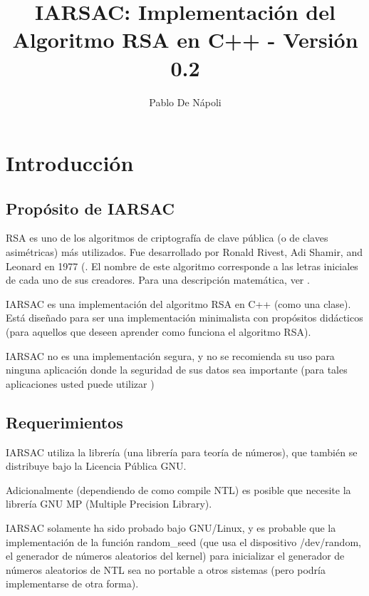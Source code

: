 \documentclass[spanish]{article}
\begin{document}
\title{IARSAC: Implementación del Algoritmo RSA en C++ - Versión 0.2}


\author{Pablo De Nápoli}

\maketitle

\section{Introducción}

\subsection*{Propósito de IARSAC}

RSA es uno de los algoritmos de criptografía de clave pública (o de
claves asimétricas) más utilizados. Fue desarrollado por Ronald Rivest,
Adi Shamir, and Leonard en 1977 (\cite{Rsa78}. El nombre de este
algoritmo corresponde a las letras iniciales de cada uno de sus 
creadores. Para una descripción matemática, ver \cite{K}.

IARSAC es una implementación del algoritmo RSA en C++ (como una clase).
Está diseñado para ser una implementación minimalista con propósitos
didácticos (para aquellos que deseen aprender como funciona el algoritmo
RSA).

IARSAC no es una implementación segura, y no se recomienda su uso
para ninguna aplicación donde la seguridad de sus datos sea importante
(para tales aplicaciones usted puede utilizar 
)

\subsection*{Requerimientos}

IARSAC utiliza la librería  
(una librería para teoría de números), que también se distribuye bajo 
la Licencia Pública GNU.

Adicionalmente (dependiendo de como compile NTL) es posible que necesite
la librería GNU MP (Multiple Precision Library).

IARSAC solamente ha sido probado bajo GNU/Linux, y es probable que la 
implementación de la función random\_seed (que usa el dispositivo /dev/random, 
el generador de números aleatorios del kernel) para inicializar 
el generador de números aleatorios de NTL sea no portable a otros
sistemas (pero podría implementarse de otra forma).
\end{document}
